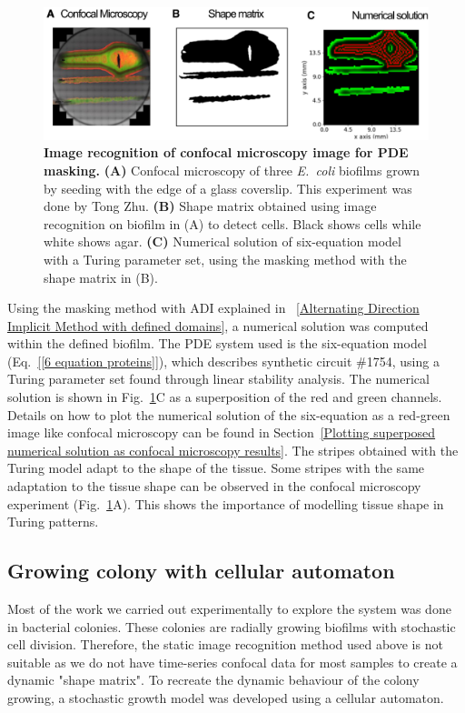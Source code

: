 \begin{figure}[H]
    \centering

    \includegraphics[width=1\textwidth]{chapters/Chapter 3/shmoo}
    \caption{\textbf{Image recognition of confocal microscopy image for PDE masking.} \textbf{(A)} Confocal microscopy of three \textit{E.~coli} biofilms grown by seeding with the edge of a glass coverslip. This experiment was done by Tong Zhu. \textbf{(B)} Shape matrix obtained using image recognition on biofilm in (A) to detect cells. Black shows cells while white shows agar. \textbf{(C)} Numerical solution of six-equation model with a Turing parameter set, using the masking method with the shape matrix in (B).}
    \label{shmoo}
\end{figure}
Using the masking method with ADI explained in ~\ref{Alternating Direction Implicit Method with defined domains}, a numerical solution was computed within the defined biofilm.
The PDE system used is the six-equation model (Eq.~\ref{[6 equation proteins]}), which describes synthetic circuit \#1754, using a Turing parameter set found through linear stability analysis.
The numerical solution is shown in Fig.~\ref{shmoo}C as a superposition of the red and green channels.
Details on how to plot the numerical solution of the six-equation as a red-green image like confocal microscopy can be found in Section~\ref{Plotting superposed numerical solution as confocal microscopy results}.
The stripes obtained with the Turing model adapt to the shape of the tissue.
Some stripes with the same adaptation to the tissue shape can be observed in the confocal microscopy experiment (Fig.~\ref{shmoo}A).
This shows the importance of modelling tissue shape in Turing patterns.

\subsection{Growing colony with cellular automaton}
Most of the work we carried out experimentally to explore the system was done in bacterial colonies.
These colonies are radially growing biofilms with stochastic cell division.
Therefore, the static image recognition method used above is not suitable as we do not have time-series confocal data for most samples to create a dynamic "shape matrix".
To recreate the dynamic behaviour of the colony growing, a stochastic growth model was developed using a cellular automaton.

